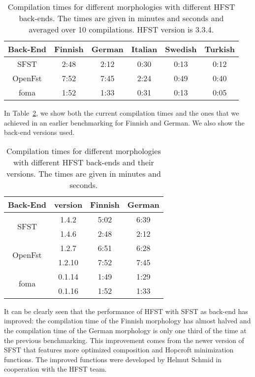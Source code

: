 \documentclass{llncs}
\begin{document}
\begin{table} [h!]
  \centering
  \caption{Compilation times for different morphologies with
    different HFST back-ends. The times are given in minutes and seconds
    and averaged over 10 compilations. HFST version is 3.3.4.}
  \begin{tabular}{| c | c | c | c | c | c |}
    \hline
    Back-End & Finnish & German & Italian & Swedish & Turkish \\ \hline\hline
    SFST & 2:48 & 2:12 & 0:30 & 0:13 & 0:12 \\ \hline
    OpenFst & 7:52 & 7:45 & 2:24 & 0:49 & 0:40 \\ \hline
    foma & 1:52 & 1:33 & 0:31 & 0:13 & 0:05 \\ \hline
  \end{tabular}
  \label{tab:compilation_times}
\end{table}


In Table~\ref{tab:compilation_times_versions}, we show both the current compilation 
times and the ones that we achieved in an earlier benchmarking \cite{linden/2011/sfcm} for 
Finnish and German. We also show the back-end versions used.

\begin{table} [h!]
  \centering
  \caption{Compilation times for different morphologies with
    different HFST back-ends and their versions. 
    The times are given in minutes and seconds.}
  \begin{tabular}{| c | c | c | c |}
    \hline
    Back-End                 & version  & Finnish  & German \\ \hline\hline
    \multirow{2}{*}{SFST}    & 1.4.2    & 5:02     & 6:39 \\
    & 1.4.6    & 2:48     & 2:12 \\ \hline
    \multirow{2}{*}{OpenFst} & 1.2.7    & 6:51     & 6:28 \\
    & 1.2.10   & 7:52     & 7:45 \\ \hline
    \multirow{2}{*}{foma}    & 0.1.14   & 1:49     & 1:29 \\
    & 0.1.16   & 1:52     & 1:33 \\
    \hline
  \end{tabular}
  \label{tab:compilation_times_versions}
\end{table}

It can be clearly seen that the performance of HFST with SFST as back-end 
has improved: the compilation time of the Finnish morphology has almost
halved and the compilation time of the German morphology is only one third of the
time at the previous benchmarking. 
This improvement comes from the newer version of SFST that features more optimized
composition and Hopcroft minimization functions. The improved functions 
were developed by Helmut Schmid in cooperation with the HFST team.
\end{document}
